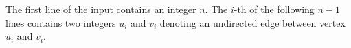 The first line of the input contains an integer $n$.
The $i$-th of the following $n - 1$ lines contains two integers $u_i$ and $v_i$ denoting an undirected edge between vertex $u_i$ and $v_i$.